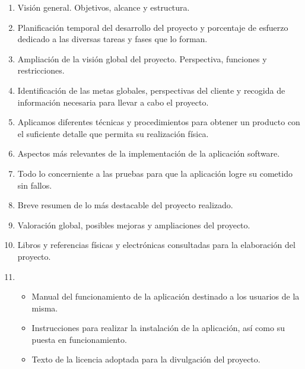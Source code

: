 \begin{enumerate}
\item {} Visión general. Objetivos, alcance y estructura.
\item {} Planificación temporal del desarrollo del
  proyecto y porcentaje de esfuerzo dedicado a las diversas tareas y fases que
  lo forman.
\item {} Ampliación de la visión
  global del proyecto. Perspectiva, funciones y restricciones.
\item {} Identificación de las metas globales, perspectivas
  del cliente y recogida de información necesaria para llevar a cabo el
  proyecto.
\item {} Aplicamos diferentes técnicas y procedimientos para
  obtener un producto con el suficiente detalle que permita su realización
  física.
\item {} Aspectos más relevantes de la implementación de
  la aplicación software.
\item {} Todo lo concerniente a las pruebas para que la
  aplicación logre su cometido sin fallos.
\item {} Breve resumen de lo más destacable del proyecto
  realizado.
\item {} Valoración global, posibles mejoras y
  ampliaciones del proyecto.
\item {} Libros y referencias físicas y electrónicas
  consultadas para la elaboración del proyecto.
\item {}
  \begin{itemize}
  \item {} Manual del funcionamiento de la aplicación
    destinado a los usuarios de la misma.
  \item {}
    Instrucciones para realizar la instalación de la aplicación, así como su
    puesta en funcionamiento.
  \item {} Texto de la licencia adoptada para la divulgación
    del proyecto.
  \end{itemize}
\end{enumerate}
